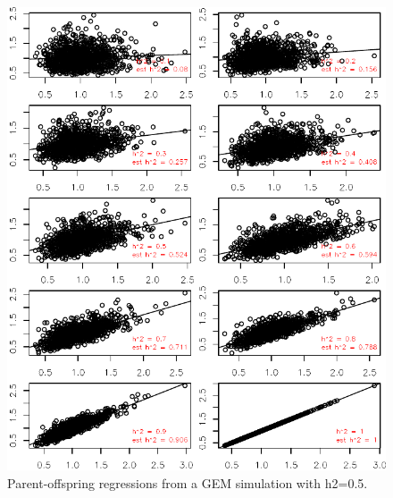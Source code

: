 \documentclass[12pt,reqno,final,pdftex]{amsart}\usepackage[]{graphicx}\usepackage[]{color}
\newenvironment{knitrout}{}{} %
\theoremstyle{plain}
\numberwithin{equation}{part}
\begin{document}
\begin{knitrout}\scriptsize
{}\color{fgcolor}\begin{figure}

\includegraphics[width=\linewidth]{figure/unnamed-chunk-7-1} \hfill{}

\caption[Parent-offspring regressions from a GEM simulation with h2=0.5]{Parent-offspring regressions from a GEM simulation with h2=0.5.}\label{fig:unnamed-chunk-7}
\end{figure}


\end{knitrout}
\end{document}
